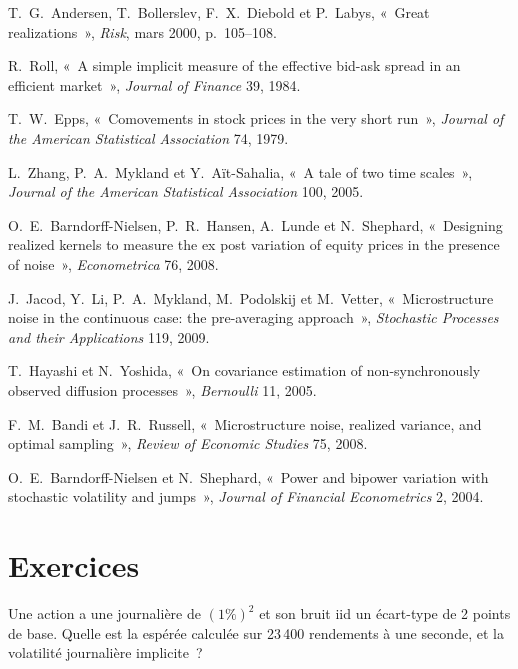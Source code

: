 \begin{omsources}
\item T.~G.~Andersen, T.~Bollerslev, F.~X.~Diebold et P.~Labys, «~Great realizations~», \emph{Risk}, mars 2000, p.~105--108.
\item R.~Roll, «~A simple implicit measure of the effective bid-ask spread in an efficient market~», \emph{Journal of Finance} 39, 1984.
\item T.~W.~Epps, «~Comovements in stock prices in the very short run~», \emph{Journal of the American Statistical Association} 74, 1979.
\item L.~Zhang, P.~A.~Mykland et Y.~Aït-Sahalia, «~A tale of two time scales~», \emph{Journal of the American Statistical Association} 100, 2005.
\item O.~E.~Barndorff-Nielsen, P.~R.~Hansen, A.~Lunde et N.~Shephard, «~Designing realized kernels to measure the ex post variation of equity prices in the presence of
noise~», \emph{Econometrica} 76, 2008.
\item J.~Jacod, Y.~Li, P.~A.~Mykland, M.~Podolskij et M.~Vetter, «~Microstructure noise in the continuous case: the pre-averaging approach~», \emph{Stochastic Processes and
their Applications} 119, 2009.
\item T.~Hayashi et N.~Yoshida, «~On covariance estimation of non-synchronously observed diffusion processes~», \emph{Bernoulli} 11, 2005.
\item F.~M.~Bandi et J.~R.~Russell, «~Microstructure noise, realized variance, and optimal sampling~», \emph{Review of Economic Studies} 75, 2008.
\item O.~E.~Barndorff-Nielsen et N.~Shephard, «~Power and bipower variation with stochastic volatility and jumps~», \emph{Journal of Financial Econometrics} 2, 2004.
\end{omsources}

\section{Exercices}

\begin{exercise}[$\star$]\label{exo:qm:high-frequency-econometrics:1}
Une action a une  journalière de $(1\%)^2$ et son bruit iid un écart-type de 2 points de base. Quelle est la  espérée calculée sur 23\,400 rendements
à une seconde, et la volatilité journalière implicite~?
\end{exercise}

